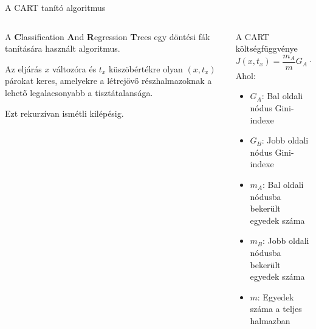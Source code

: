 \documentclass[english, aspectratio=169]{beamer}
\begin{document}
\begin{frame}{A CART tanító algoritmus}
\begin{columns}
\begin{column}{.5\textwidth}
A \textbf{C}lassification \textbf{A}nd \textbf{R}egression \textbf{T}rees egy döntési fák tanítására használt algoritmus.\par\smallskip
Az eljárás $x$ változóra és $t_x$ küszöbértékre olyan $\left(x,t_x\right)$ párokat keres, amelyekre a létrejövő részhalmazoknak a lehető legalacsonyabb a tisztátalansága.\par\smallskip
Ezt rekurzívan ismétli kilépésig.
\end{column}
\begin{column}{.5\textwidth}
\begin{block}{A CART költségfüggvénye}
\[
J\left(x,t_x\right) = \frac{m_{A}}{m}G_A + \frac{m_B}{m}G_B
\]
Ahol:
\begin{itemize}
	\item $G_A$: Bal oldali nódus Gini-indexe
	\item $G_B$: Jobb oldali nódus Gini-indexe
	\item $m_A$: Bal oldali nódusba bekerült egyedek száma
	\item $m_B$: Jobb oldali nódusba bekerült egyedek száma
	\item $m$: Egyedek száma a teljes halmazban
\end{itemize}
\end{block}
\end{column}
\end{columns}
\end{frame}
\end{document}
